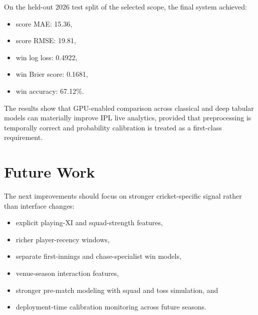 \documentclass[conference]{IEEEtran}
\begin{document}
On the held-out 2026 test split of the selected scope, the final system achieved:
\begin{itemize}
\item score MAE: 15.36,
\item score RMSE: 19.81,
\item win log loss: 0.4922,
\item win Brier score: 0.1681,
\item win accuracy: 67.12\%.
\end{itemize}

The results show that GPU-enabled comparison across classical and deep tabular models can materially improve IPL live analytics, provided that preprocessing is temporally correct and probability calibration is treated as a first-class requirement.

\section{Future Work}
The next improvements should focus on stronger cricket-specific signal rather than interface changes:
\begin{itemize}
\item explicit playing-XI and squad-strength features,
\item richer player-recency windows,
\item separate first-innings and chase-specialist win models,
\item venue-season interaction features,
\item stronger pre-match modeling with squad and toss simulation, and
\item deployment-time calibration monitoring across future seasons.
\end{itemize}
\end{document}
